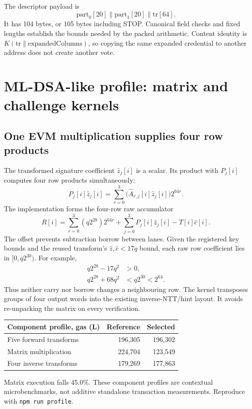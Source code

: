 \documentclass[11pt,a4paper]{article}
\newcommand{\local}{\textbf{L}}
\begin{document}
The descriptor payload is
\begin{equation*}
 \mathrm{part}_0[20]\parallel\mathrm{part}_1[20]\parallel\mathrm{tr}[64].
\end{equation*}
It has 104 bytes, or 105 bytes including STOP. Canonical field checks and
fixed lengths establish the bounds needed by the packed arithmetic. Content
identity is $K(\mathrm{tr}\parallel\mathrm{expandedColumns})$, so copying
the same expanded credential to another address does not create another vote.

\newpage
\section{ML-DSA-like profile: matrix and challenge kernels}
\subsection{One EVM multiplication supplies four row products}
The transformed signature coefficient $\widehat z_j[i]$ is a scalar. Its
product with $P_j[i]$ computes four row products simultaneously:
\begin{equation}
 P_j[i]\widehat z_j[i]
 =\sum_{r=0}^{3}\big(\widehat A_{r,j}[i]\widehat z_j[i]\big)2^{64r}.
\end{equation}
The implementation forms the four-row raw accumulator
\begin{equation}
 R[i]=\sum_{r=0}^{3}(q2^{28})2^{64r}
       +\sum_{j=0}^{3}P_j[i]\widehat z_j[i]-T[i]\widehat c[i].
\end{equation}
The offset prevents subtraction borrow between lanes. Given the registered
key bounds and the reused transform's $\widehat z,\widehat c<17q$ bound,
each raw row coefficient lies in $[0,q2^{30})$. For example,
\begin{align*}
 q2^{28}-17q^2 &> 0,\\
 q2^{28}+68q^2 &< q2^{30}<2^{64}.
\end{align*}
Thus neither carry nor borrow changes a neighbouring row. The kernel
transposes groups of four output words into the existing inverse-NTT/hint
layout. It avoids re-unpacking the matrix on every verification.

\begin{tabularx}{\linewidth}{Yrr}
\toprule
\textbf{Component profile, gas (\local)} & \textbf{Reference} & \textbf{Selected}\\
\midrule
Five forward transforms & 196,305 & 196,302\\
Matrix multiplication & 224,704 & 123,549\\
Four inverse transforms & 179,269 & 177,863\\
\bottomrule
\end{tabularx}
{\small Matrix execution falls 45.0\%. These
component profiles are contextual microbenchmarks, not additive standalone
transaction measurements. Reproduce with \texttt{npm run profile}.}
\end{document}
